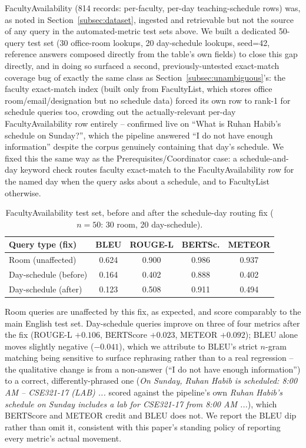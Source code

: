 \documentclass[a4paper,twoside]{article}
\begin{document}
FacultyAvailability (814 records: per-faculty, per-day teaching-schedule rows) was, as noted in Section~\ref{subsec:dataset}, ingested and retrievable but not the source of any query in the automated-metric test sets above. We built a dedicated 50-query test set (30 office-room lookups, 20 day-schedule lookups, seed=42, reference answers composed directly from the table's own fields) to close this gap directly, and in doing so surfaced a second, previously-untested exact-match coverage bug of exactly the same class as Section~\ref{subsec:unambiguous}'s: the faculty exact-match index (built only from FacultyList, which stores office room/email/designation but no schedule data) forced its own row to rank-1 for schedule queries too, crowding out the actually-relevant per-day FacultyAvailability row entirely -- confirmed live on ``What is Ruhan Habib's schedule on Sunday?'', which the pipeline answered ``I do not have enough information'' despite the corpus genuinely containing that day's schedule. We fixed this the same way as the Prerequisites/Coordinator case: a schedule-and-day keyword check routes faculty exact-match to the FacultyAvailability row for the named day when the query asks about a schedule, and to FacultyList otherwise.

\begin{table}[t]
\caption{FacultyAvailability test set, before and after the schedule-day routing fix ($n=50$: 30 room, 20 day-schedule).}\label{tab:faculty-coverage} \centering
\begin{tabular}{|l|c|c|c|c|}
\hline
Query type (fix) & BLEU & ROUGE-L & BERTSc. & METEOR \\
\hline
Room (unaffected) & 0.624 & 0.900 & 0.986 & 0.937 \\
Day-schedule (before) & 0.164 & 0.402 & 0.888 & 0.402 \\
Day-schedule (after) & 0.123 & 0.508 & 0.911 & 0.494 \\
\hline
\end{tabular}
\end{table}

Room queries are unaffected by this fix, as expected, and score comparably to the main English test set. Day-schedule queries improve on three of four metrics after the fix (ROUGE-L $+0.106$, BERTScore $+0.023$, METEOR $+0.092$); BLEU alone moves slightly negative ($-0.041$), which we attribute to BLEU's strict $n$-gram matching being sensitive to surface rephrasing rather than to a real regression -- the qualitative change is from a non-answer (``I do not have enough information'') to a correct, differently-phrased one (\emph{On Sunday, Ruhan Habib is scheduled: 8:00 AM -- CSE321-17 (LAB) ...} scored against the pipeline's own \emph{Ruhan Habib's schedule on Sunday includes a lab for CSE321-17 from 8:00 AM ...}), which BERTScore and METEOR credit and BLEU does not. We report the BLEU dip rather than omit it, consistent with this paper's standing policy of reporting every metric's actual movement.
\end{document}
